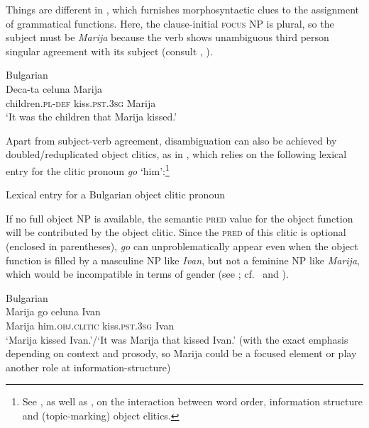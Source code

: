 \documentclass[output=paper,hidelinks]{langscibook}
\begin{document}
Things are different in , which furnishes morphosyntactic clues to the assignment of grammatical functions. Here, the clause-initial \textsc{focus} NP is plural, so the subject must be \textit{Marija} because the verb shows unambiguous third person singular agreement with its subject (consult \citealt[15]{Rudin1985}, \citealt[137]{dalrymple01}).

\ea Bulgarian\\%
    \label{ex:Slavic:18}
    \gll Deca-ta     celuna     Marija\\
        children.\textsc{pl}{}-\textsc{def}   kiss.\textsc{pst.3sg}   Marija  \\
    \glt`It was the children that Marija kissed.'
    \z

Apart from subject-verb agreement, disambiguation can
also be achieved by doubled/reduplicated object clitics, as in , which relies on the following lexical entry for the clitic pronoun \textit{go} `him':\footnote{See \citet[17]{Rudin1985}, as well as \citet{JaegerGerassimova2002}, on the interaction between word order, information structure and (topic-marking) object clitics.}

\ea Lexical entry for a Bulgarian object clitic pronoun \label{ex:Slavic:19}\\[1ex]
\z

If no full object NP is available, the semantic \textsc{pred} value for the object function will be contributed by the object clitic. Since the \textsc{pred} of this clitic is optional (enclosed in parentheses), \textit{go} can unproblematically appear even when the object function is filled by a masculine NP like \textit{Ivan}, but not a feminine NP like \textit{Marija}, which would be incompatible in terms of gender (see \citealt[135, 138]{dalrymple01}; cf.\  and ). 

\ea\label{ex:Slavic:20} Bulgarian\\%
    \gll Marija   go       celuna     Ivan\\
      Marija     him.\textsc{obj.clitic}   kiss.\textsc{pst.3sg}   Ivan\\
    \glt `Marija kissed Ivan.'/`It was Marija that kissed Ivan.' (with the exact emphasis depending on context and prosody, so Marija could be a focused element or play another role at information-structure)
    \z
\end{document}

